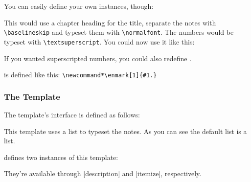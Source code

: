\documentclass[toc=bib,toc=index]{cnpkgdoc}
\begin{document}
You can easily define your own instances, though:
This would use a chapter heading for the title, separate the notes with
\verb=\baselineskip= and typeset them with \verb=\normalfont=.  The numbers
would be typeset with \verb=\textsuperscript=.  You could now use it like
this:
\begin{beispiel}
  \printendnotes[custom]
\end{beispiel}

If you wanted superscripted numbers, you could also redefine . 
\begin{beschreibung}
  \newline
    is defined like this: \verb=\newcommand*\enmark[1]{#1.}=
\end{beschreibung}

\subsubsection{The  Template}
The  template's interface is defined as follows:
This template uses a list to typeset the notes.  As you can see the default
list is a  list.

\enotez defines two instances of this template:
\begin{beispiel}
\end{beispiel}
They're available through [description] and
[itemize], respectively.
\end{document}
